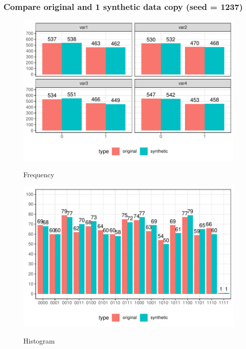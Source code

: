 \documentclass[t,8pt,utfx8]{beamer}
\begin{document}
\begin{spacing}{1.25}
\begin{frame}[t]\frametitle{Compare original and 1 synthetic data copy (seed = 1237)}
\begin{minipage}{0.48\textwidth}
    \begin{figure}
        \centering
        \caption{Frequency}
        \includegraphics[width=\textwidth]{../../graphs/graph_cart_frequency_compare.pdf}
        \label{fig:frequency_compare}
    \end{figure}
\end{minipage}
\hfill
\begin{minipage}{0.48\textwidth}
    \begin{figure}
        \centering
        \caption{Histogram}
        \includegraphics[width=\textwidth]{../../graphs/graph_cart_histogram_compare.pdf}
        \label{fig:histogram_compare}
    \end{figure}
\end{minipage}
\end{frame}


\end{spacing}
\end{document}

